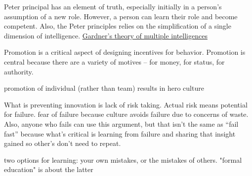 Peter principal \cite{1970_Peter} has an element of truth, especially initially in a person's assumption of a new role. However, a person can learn their role and become competent. Also, the Peter principles relies on the simplification of a single dimension of intelligence. 
\href{https://en.wikipedia.org/wiki/Theory_of_multiple_intelligences}{Gardner's theory of multiple intelligences}


Promotion is a critical aspect of designing incentives for behavior. Promotion is central because there are a variety of motives -- for money, for status, for authority. 

promotion of individual (rather than team) results in hero culture

What is preventing innovation is lack of risk taking. Actual risk means potential for failure. fear of failure because culture avoids failure due to concerns of waste. Also, anyone who fails can use this argument, but that isn't the same as ``fail fast'' because what's critical is learning from failure and sharing that insight gained so other's don't need to repeat. 

two options for learning: your own mistakes, or the mistakes of others. "formal education" is about the latter
